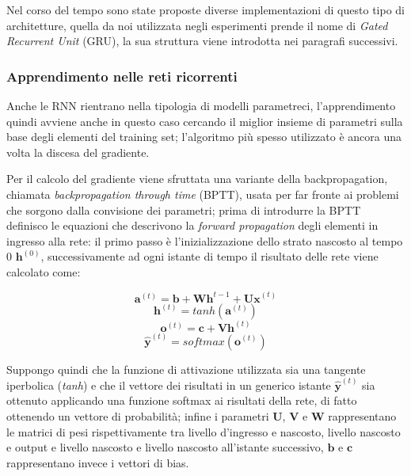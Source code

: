 \documentclass[../../main.tex]{subfiles}
\begin{document}
Nel corso del tempo sono state proposte diverse implementazioni di questo tipo di architetture, quella da noi utilizzata negli esperimenti prende il nome di \textit{Gated Recurrent Unit} (GRU), la sua struttura viene introdotta nei paragrafi successivi.

\subsubsection{Apprendimento nelle reti ricorrenti}
Anche le RNN rientrano nella tipologia di modelli parametreci, l'apprendimento quindi avviene anche in questo caso cercando il miglior insieme di parametri sulla base degli elementi del training set; l'algoritmo più spesso utilizzato è ancora una volta la discesa del gradiente.

Per il calcolo del gradiente viene sfruttata una variante della  backpropagation, chiamata \textit{backpropagation through time} (BPTT), usata per far fronte ai problemi che sorgono dalla convisione dei parametri; prima di introdurre la BPTT definisco le equazioni che descrivono la \textit{forward propagation} degli elementi in ingresso alla rete: il primo passo è l'inizializzazione dello strato nascosto al tempo 0 $\boldsymbol{h}^{(0)}$, successivamente ad ogni istante di tempo il risultato delle rete viene calcolato come:
\begin{fleqn}[1cm]
    \begin{equation}
        \boldsymbol{a}^{(t)} = \boldsymbol{b} + \boldsymbol{W h}^{t-1} + \boldsymbol{U x}^{(t)}
    \end{equation}
    \begin{equation}
        \boldsymbol{h}^{(t)} = tanh(\boldsymbol{a}^{(t)})
    \end{equation}
    \begin{equation}
        \boldsymbol{o}^{(t)} = \boldsymbol{c} + \boldsymbol{V h}^{(t)}
    \end{equation}
    \begin{equation}
        \boldsymbol{\hat{y}}^{(t)} = softmax(\boldsymbol{o}^{(t)})
    \end{equation}
\end{fleqn}
Suppongo quindi che la funzione di attivazione utilizzata sia una tangente iperbolica (\textit{tanh}) e che il vettore dei risultati in un generico istante $\boldsymbol{\hat{y}}^{(t)}$ sia ottenuto applicando una funzione softmax ai risultati della rete, di fatto ottenendo un vettore di probabilità; infine i parametri $\boldsymbol{U}$, $\boldsymbol{V}$ e $\boldsymbol{W}$ rappresentano le matrici di pesi rispettivamente tra livello d'ingresso e nascosto, livello nascosto e output e livello nascosto e livello nascosto all'istante successivo, $\boldsymbol{b}$ e $\boldsymbol{c}$ rappresentano invece i vettori di bias.
\end{document}

